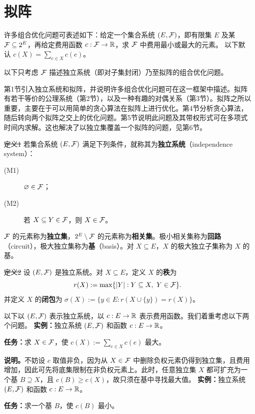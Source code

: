\section*{拟阵}
许多组合优化问题可表述如下：给定一个集合系统 $(E,\mathcal F)$，即有限集 $E$ 及某 $\mathcal F\subseteq2^E$，再给定费用函数 $c:\mathcal F\to\mathbb R$，求 $\mathcal F$ 中费用最小或最大的元素。
以下默认 $c(X)=\sum_{e\in X}c(e)$。

以下只考虑 $\mathcal F$ 描述独立系统（即对子集封闭）乃至拟阵的组合优化问题。

第1节引入独立系统和拟阵，并说明许多组合优化问题可在这一框架中描述。拟阵有若干等价的公理系统（第2节），以及一种有趣的对偶关系（第3节）。拟阵之所以重要，主要在于可以用简单的贪心算法在拟阵上进行优化。第4节分析贪心算法，随后转向两个拟阵之交上的优化问题。第5节说明此问题及其带权形式可在多项式时间内求解。这也解决了以独立集覆盖一个拟阵的问题，见第6节。

\st{定义1} 若集合系统 $(E,\mathcal F)$ 满足下列条件，就称其为\textbf{独立系统}（independence system）：
\begin{description}
\item[(M1)] $\varnothing\in\mathcal F$；
\item[(M2)] 若 $X\subseteq Y\in\mathcal F$，则 $X\in\mathcal F$。
\end{description}
$\mathcal F$ 的元素称为\textbf{独立集}，$2^E\setminus\mathcal F$ 的元素称为\textbf{相关集}。极小相关集称为\textbf{回路}（circuit），极大独立集称为\textbf{基}（basis）。对 $X\subseteq E$，$X$ 的极大独立子集称为 $X$ 的基。

\st{定义2} 设 $(E,\mathcal F)$ 是独立系统。对 $X\subseteq E$，定义 $X$ 的\textbf{秩}为
\[r(X):=\max\{|Y|:Y\subseteq X,\ Y\in\mathcal F\}.\]
并定义 $X$ 的\textbf{闭包}为 $\sigma(X):=\{y\in E:r(X\cup\{y\})=r(X)\}$。

以下以 $(E,\mathcal F)$ 表示独立系统，以 $c:E\to\mathbb R$ 表示费用函数。我们着重考虑以下两个问题。
\textbf{实例：}独立系统 $(E,\mathcal F)$ 和函数 $c:E\to\mathbb R$。\par
\textbf{任务：}求 $X\in\mathcal F$，使 $c(X):=\sum_{e\in X}c(e)$ 最大。
\par\smallskip\noindent\textbf{说明。}不妨设 $c$ 取值非负，因为从 $X\in\mathcal F$ 中删除负权元素仍得到独立集，且费用增加，因此可先将底集限制在非负权元素上。此时，任意独立集 $X$ 都可扩充为一个基 $B\supseteq X$，且 $c(B)\ge c(X)$，故只须在基中寻找最大值。
\textbf{实例：}独立系统 $(E,\mathcal F)$ 和函数 $c:E\to\mathbb R$。\par
\textbf{任务：}求一个基 $B$，使 $c(B)$ 最小。

